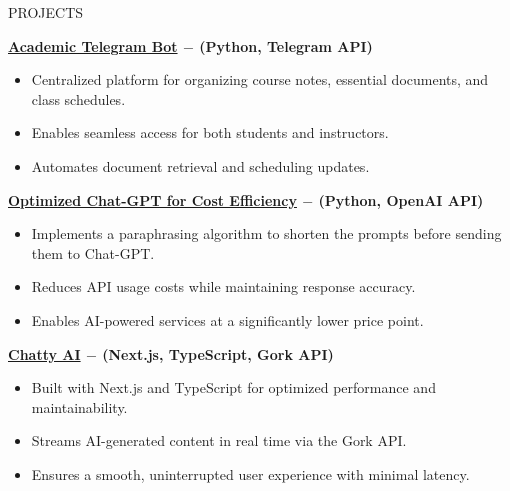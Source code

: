 \documentclass{resume} %
\begin{document}
\begin{rSection}{PROJECTS}
\vspace{-1.25em}
\item \textbf{\href{https://github.com/jackwaghan/Academic-Helper-TelegramBot}{Academic Telegram Bot} \(-\) (Python, Telegram API)}  
    \begin{itemize}
        \item Centralized platform for organizing course notes, essential documents, and class schedules.  
        \item Enables seamless access for both students and instructors.  
        \item Automates document retrieval and scheduling updates.  
    \end{itemize}  

\item \textbf{\href{https://github.com/jackwaghan/rapidapi}{Optimized Chat-GPT for Cost Efficiency} \(-\) (Python, OpenAI API)}  
    \begin{itemize}
        \item Implements a paraphrasing algorithm to shorten the prompts before sending them to Chat-GPT.  
        \item Reduces API usage costs while maintaining response accuracy.  
        \item Enables AI-powered services at a significantly lower price point.  
    \end{itemize}  

\item \textbf{\href{https://github.com/jackwaghan/Chatty-AI}{Chatty AI} \(-\) (Next.js, TypeScript, Gork API)}  
    \begin{itemize}
        \item Built with Next.js and TypeScript for optimized performance and maintainability.  
        \item Streams AI-generated content in real time via the Gork API.  
        \item Ensures a smooth, uninterrupted user experience with minimal latency.  
    \end{itemize}  
\end{rSection}


\end{document}

